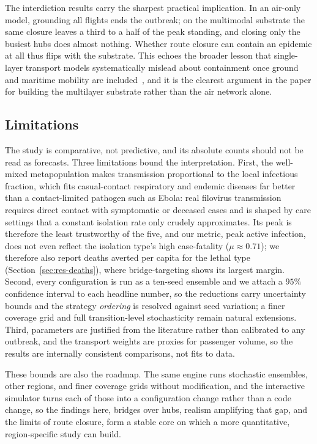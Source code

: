 The interdiction results carry the sharpest practical implication. In an air-only model, grounding
all flights ends the outbreak; on the multimodal substrate the same closure leaves a third to a
half of the peak standing, and closing only the busiest hubs does almost nothing. Whether route
closure can contain an epidemic at all thus flips with the substrate. This echoes the broader
lesson that single-layer transport models systematically mislead about containment once ground and
maritime mobility are included~\cite{balcan:multiscale}, and it is the clearest argument in the
paper for building the multilayer substrate rather than the air network alone.

\subsection{Limitations}\label{sec:limitations}
The study is comparative, not predictive, and its absolute counts should not be read as forecasts.
Three limitations bound the interpretation. First, the well-mixed metapopulation makes transmission
proportional to the local infectious fraction, which fits casual-contact respiratory and endemic
diseases far better than a contact-limited pathogen such as Ebola: real filovirus transmission
requires direct contact with symptomatic or deceased cases and is shaped by care settings that a
constant isolation rate only crudely approximates. Its peak is therefore the least trustworthy of
the five, and our metric, peak active infection, does not even reflect the isolation type's high
case-fatality ($\mu\approx0.71$); we therefore also report deaths averted per capita for the lethal
type (Section~\ref{sec:res-deaths}), where bridge-targeting shows its largest margin. Second, every
configuration is run as a ten-seed ensemble and we attach a $95\%$ confidence interval to each
headline number, so the reductions carry uncertainty bounds and the strategy \emph{ordering} is
resolved against seed variation; a finer coverage grid and full transition-level stochasticity
remain natural extensions. Third, parameters are
justified from the literature rather than calibrated to any outbreak, and the transport weights are
proxies for passenger volume, so the results are internally consistent comparisons, not fits to
data.

These bounds are also the roadmap. The same engine runs stochastic ensembles, other regions, and
finer coverage grids without modification, and the interactive simulator turns each of those into a
configuration change rather than a code change, so the findings here, bridges over hubs, realism
amplifying that gap, and the limits of route closure, form a stable core on which a more
quantitative, region-specific study can build.
